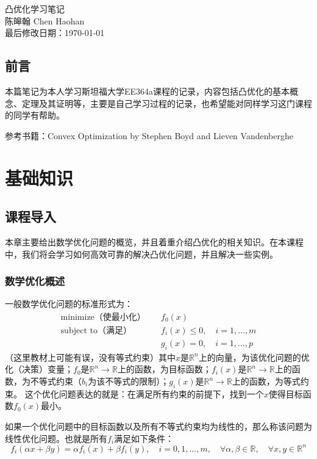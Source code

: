 \documentclass[12pt,a4paper]{book}
\begin{document}
\begin{titlepage}
\centering
\vspace*{5cm}
{\Huge 凸优化学习笔记}\\[2cm]
{\LARGE 陈皞翰 Chen Haohan}\\[2cm]
{\large 最后修改日期：\today}
\end{titlepage}
\let\cleardoublepage\clearpage

\tableofcontents

\chapter*{前言}
本篇笔记为本人学习斯坦福大学EE364a课程的记录，内容包括凸优化的基本概念、定理及其证明等，主要是自己学习过程的记录，也希望能对同样学习这门课程的同学有帮助。

参考书籍：Convex Optimization by Stephen Boyd and Lieven Vandenberghe


\mainmatter
\part{基础知识}
\chapter{课程导入}
本章主要给出数学优化问题的概览，并且着重介绍凸优化的相关知识。在本课程中，我们将会学习如何高效可靠的解决凸优化问题，并且解决一些实例。
\section{数学优化概述}
一般数学优化问题的标准形式为：
\begin{align*}
\text{minimize（使最小化）} \quad & f_0(x) \\
\text{subject to（满足）} \quad & f_i(x) \leq 0, \quad i = 1, \ldots, m \\
& g_i(x) = 0, \quad i = 1, \ldots, p
\end{align*}
（这里教材上可能有误，没有等式约束）其中$x$是$\mathbb{R}^n$上的向量，为该优化问题的优化（决策）变量；$f_0$是$\mathbb{R}^n \rightarrow \mathbb{R}$上的函数，为目标函数；$f_i(x)$是$\mathbb{R}^n \rightarrow \mathbb{R}$上的函数，为不等式约束（$b_i$为该不等式的限制）；$g_i(x)$是$\mathbb{R}^n \rightarrow \mathbb{R}$上的函数，为等式约束。
这个优化问题表达的就是：在满足所有约束的前提下，找到一个$x$使得目标函数$f_0(x)$最小。

如果一个优化问题中的目标函数以及所有不等式约束均为线性的，那么称该问题为线性优化问题。也就是所有$f_i$满足如下条件：$$f_i(\alpha x + \beta y) = \alpha f_i(x) + \beta f_i(y) , \quad i = 0, 1, \ldots, m,\quad \forall \alpha, \beta \in \mathbb{R} ,\quad \forall x, y \in \mathbb{R}^n $$
\end{document}
